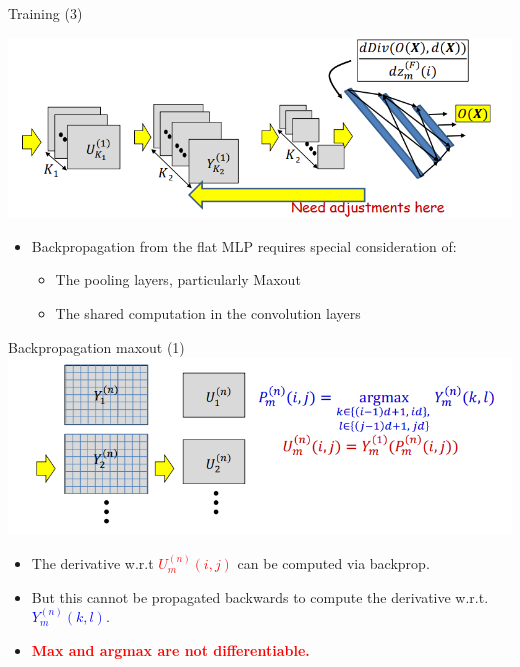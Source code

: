 \documentclass[default, aspectratio=169]{beamer}
\begin{document}
	\begin{frame}{Training (3)}
		
		\centering
		\includegraphics[keepaspectratio, scale=0.6]{pic/training2.png}
		\smallskip
		
		\begin{itemize}
			\item Backpropagation from the flat MLP requires special consideration of:
			\begin{itemize}
				\item The pooling layers, particularly Maxout
				\item The shared computation in the convolution layers
			\end{itemize}
			
			
		\end{itemize}
		
		
	\end{frame}
	\begin{frame}{Backpropagation maxout (1)}
		\centering
		\includegraphics[keepaspectratio, scale=0.6]{pic/training3.png}
		\smallskip
		
		\begin{itemize}
			\item The derivative w.r.t \textcolor{red}{\( U^{(n)}_m (i,j) \)} can be computed via backprop.
			\item But this cannot be propagated backwards to compute the derivative w.r.t. \textcolor{blue}{\( Y^{(n)}_m (k,l) \)}.
			\item \textcolor{red}{\textbf{Max and argmax are not differentiable.}}
		\end{itemize}
		
	\end{frame}
\end{document}
